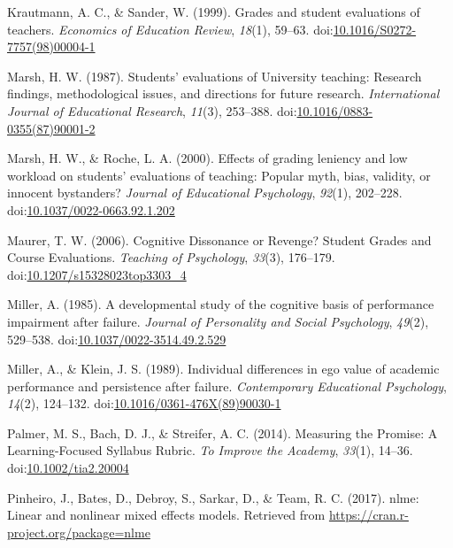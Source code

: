 \documentclass[man]{apa6}
\theoremstyle{definition}
\theoremstyle{definition}
\theoremstyle{definition}
\theoremstyle{remark}
\begin{document}
\leavevmode\hypertarget{ref-Krautmann1999}{}%
Krautmann, A. C., \& Sander, W. (1999). Grades and student evaluations
of teachers. \emph{Economics of Education Review}, \emph{18}(1), 59--63.
doi:\href{https://doi.org/10.1016/S0272-7757(98)00004-1}{10.1016/S0272-7757(98)00004-1}

\leavevmode\hypertarget{ref-Marsh1987}{}%
Marsh, H. W. (1987). Students' evaluations of University teaching:
Research findings, methodological issues, and directions for future
research. \emph{International Journal of Educational Research},
\emph{11}(3), 253--388.
doi:\href{https://doi.org/10.1016/0883-0355(87)90001-2}{10.1016/0883-0355(87)90001-2}

\leavevmode\hypertarget{ref-Marsh2000}{}%
Marsh, H. W., \& Roche, L. A. (2000). Effects of grading leniency and
low workload on students' evaluations of teaching: Popular myth, bias,
validity, or innocent bystanders? \emph{Journal of Educational
Psychology}, \emph{92}(1), 202--228.
doi:\href{https://doi.org/10.1037/0022-0663.92.1.202}{10.1037/0022-0663.92.1.202}

\leavevmode\hypertarget{ref-Maurer2006}{}%
Maurer, T. W. (2006). Cognitive Dissonance or Revenge? Student Grades
and Course Evaluations. \emph{Teaching of Psychology}, \emph{33}(3),
176--179.
doi:\href{https://doi.org/10.1207/s15328023top3303_4}{10.1207/s15328023top3303\_4}

\leavevmode\hypertarget{ref-Miller1985}{}%
Miller, A. (1985). A developmental study of the cognitive basis of
performance impairment after failure. \emph{Journal of Personality and
Social Psychology}, \emph{49}(2), 529--538.
doi:\href{https://doi.org/10.1037/0022-3514.49.2.529}{10.1037/0022-3514.49.2.529}

\leavevmode\hypertarget{ref-Miller1989}{}%
Miller, A., \& Klein, J. S. (1989). Individual differences in ego value
of academic performance and persistence after failure.
\emph{Contemporary Educational Psychology}, \emph{14}(2), 124--132.
doi:\href{https://doi.org/10.1016/0361-476X(89)90030-1}{10.1016/0361-476X(89)90030-1}

\leavevmode\hypertarget{ref-Palmer2014}{}%
Palmer, M. S., Bach, D. J., \& Streifer, A. C. (2014). Measuring the
Promise: A Learning-Focused Syllabus Rubric. \emph{To Improve the
Academy}, \emph{33}(1), 14--36.
doi:\href{https://doi.org/10.1002/tia2.20004}{10.1002/tia2.20004}

\leavevmode\hypertarget{ref-Pinheiro2017}{}%
Pinheiro, J., Bates, D., Debroy, S., Sarkar, D., \& Team, R. C. (2017).
nlme: Linear and nonlinear mixed effects models. Retrieved from
\url{https://cran.r-project.org/package=nlme}
\end{document}
